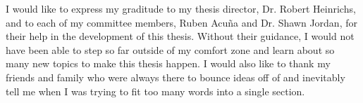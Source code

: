 \documentclass[
11pt, %
english, %
singlespacing, %
headsepline, %
]{MastersDoctoralThesis} %
\begin{document}
\begin{acknowledgements}
	\addchaptertocentry{\acknowledgementname} %
	I would like to express my graditude to my thesis director, Dr. Robert Heinrichs, and to each of my committee members, Ruben Acu\~{n}a and Dr. Shawn Jordan, for their help in the development of this thesis.
	Without their guidance, I would not have been able to step so far outside of my comfort zone and learn about so many new topics to make this thesis happen.
	I would also like to thank my friends and family who were always there to bounce ideas off of and inevitably tell me when I was trying to fit too many words into a single section.
\end{acknowledgements}


\tableofcontents %

\listoffigures %

\listoftables %

\end{document}
